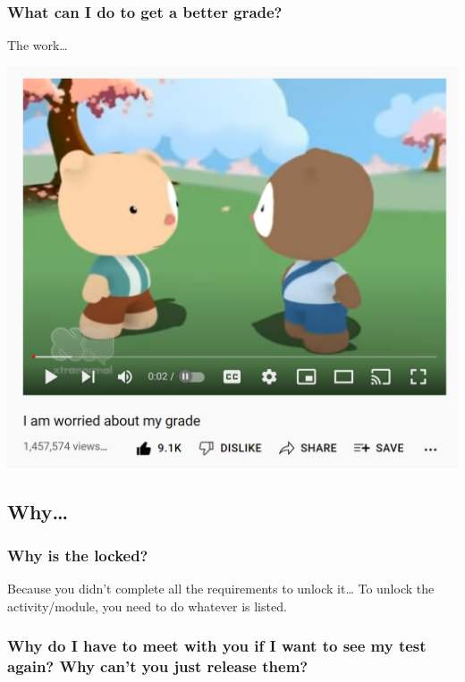 \hypertarget{what-can-i-do-to-get-a-better-grade}{%
\subsubsection{What can I do to get a better grade?}\label{what-can-i-do-to-get-a-better-grade}}

The work\ldots{}

\includegraphics[width=18.14in]{img/worriedgrade}

\hypertarget{why}{%
\subsection{Why\ldots{}}\label{why}}

\hypertarget{why-is-the-locked}{%
\subsubsection{\texorpdfstring{Why is the locked?}{Why is the  locked?}}\label{why-is-the-locked}}

Because you didn't complete all the requirements to unlock it\ldots{} To unlock the activity/module, you need to do whatever is listed.

\hypertarget{why-do-i-have-to-meet-with-you-if-i-want-to-see-my-test-again-why-cant-you-just-release-them}{%
\subsubsection{Why do I have to meet with you if I want to see my test again? Why can't you just release them?}\label{why-do-i-have-to-meet-with-you-if-i-want-to-see-my-test-again-why-cant-you-just-release-them}}

